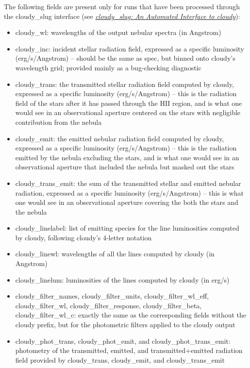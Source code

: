 \documentclass[letterpaper,10pt,english]{sphinxmanual}
\begin{document}
The following fields are present only for runs that have been processed through the cloudy\_slug interface (see {\hyperref[cloudy:sec\string-cloudy\string-slug]{\emph{cloudy\_slug: An Automated Interface to cloudy}}}):
\begin{itemize}
\item {} 
cloudy\_wl: wavelengths of the output nebular spectra (in Angstrom)

\item {} 
cloudy\_inc: incident stellar radiation field, expressed as a specific luminosity (erg/s/Angstrom) -- should be the same as spec, but binned onto cloudy's wavelength grid; provided mainly as a bug-checking diagnostic

\item {} 
cloudy\_trans: the transmitted stellar radiation field computed by cloudy, expressed as a specific luminosity (erg/s/Angstrom) -- this is the radiation field of the stars after it has passed through the HII region, and is what one would see in an observational aperture centered on the stars with negligible contribution from the nebula

\item {} 
cloudy\_emit: the emitted nebular radiation field computed by cloudy, expressed as a specific luminosity (erg/s/Angstrom) -- this is the radiation emitted by the nebula excluding the stars, and is what one would see in an observational aperture that included the nebula but masked out the stars

\item {} 
cloudy\_trans\_emit: the sum of the transmitted stellar and emitted nebular radiation, expressed as a specific luminosity (erg/s/Angstrom) -- this is what one would see in an observational aperture covering the both the stars and the nebula

\item {} 
cloudy\_linelabel: list of emitting species for the line luminosities computed by cloudy, following cloudy's 4-letter notation

\item {} 
cloudy\_linewl: wavelengths of all the lines computed by cloudy (in Angstrom)

\item {} 
cloudy\_linelum: luminosities of the lines computed by cloudy (in erg/s)

\item {} 
cloudy\_filter\_names, cloudy\_filter\_units, cloudy\_filter\_wl\_eff, cloudy\_filter\_wl, cloudy\_filter\_response, cloudy\_filter\_beta, cloudy\_filter\_wl\_c: exactly the same as the corresponding fields without the cloudy prefix, but for the photometric filters applied to the cloudy output

\item {} 
cloudy\_phot\_trans, cloudy\_phot\_emit, and cloudy\_phot\_trans\_emit: photometry of the transmitted, emitted, and transmitted+emitted radiation field provided by cloudy\_trans, cloudy\_emit, and cloudy\_trans\_emit

\end{itemize}
\end{document}
